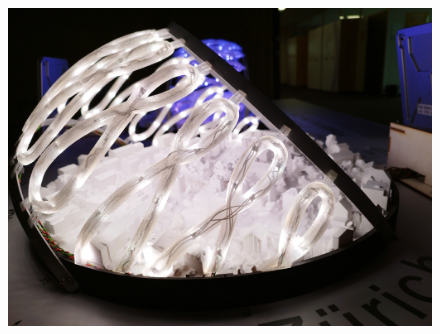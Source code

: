 \documentclass[a4paper,9pt]{article}
\begin{document}
    \hfill
    \begin{minipage}{0.48\linewidth}
         \begin{figure}[H]
        \centering
        \includegraphics[width=\linewidth]{Images/f2.jpg}
    
    \end{figure}
\end{minipage}
\newpage
\end{document}
